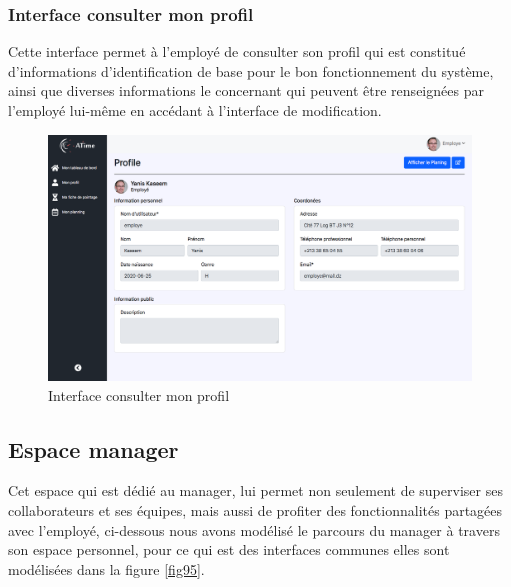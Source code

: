 \vspace{-10pt}   
\subsubsection*{Interface consulter mon profil}
Cette interface permet à l’employé de consulter son profil qui est constitué 
d’informations d'identification de base pour le bon fonctionnement du système, 
ainsi que diverses informations le concernant qui peuvent être renseignées par 
l’employé lui-même en accédant à l’interface de modification.
            
\begin{figure}[h!]
    \centering
    \includegraphics[scale=0.306 ]{images/interface/mon_profil.png}
    \caption{Interface consulter mon profil}
    \label{fig94}
\end{figure}

\clearpage
       
\subsection{Espace manager}
Cet espace qui est dédié au manager, lui permet non seulement de superviser ses 
collaborateurs et ses équipes, mais aussi de profiter des fonctionnalités 
partagées avec l’employé, ci-dessous nous avons modélisé le parcours du manager 
à travers son espace personnel, pour ce qui est des interfaces communes elles 
sont modélisées dans la figure \ref{fig95}.
      
